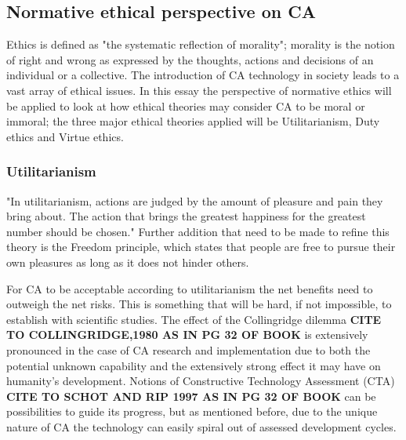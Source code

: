 \subsection{Normative ethical perspective on CA}

Ethics is defined as "the systematic reflection of morality"\cite[ch. 3.2]{Ethics_textbook}; morality is the notion of right and wrong as expressed by the thoughts, actions and decisions of an individual or a collective. The introduction of CA technology in society leads to a vast array of ethical issues. In this essay the perspective of normative ethics will be applied to look at how ethical theories may consider CA to be moral or immoral; the three major ethical theories applied will be Utilitarianism, Duty ethics and Virtue ethics.



\subsubsection{Utilitarianism}

"In utilitarianism, actions are judged by the amount of pleasure and pain they bring about. The action that brings the greatest happiness for the greatest number should be chosen." \cite[ch. 3.7]{Ethics_textbook} Further addition that need to be made to refine this theory is the Freedom principle, which states that people are free to pursue their own pleasures as long as it does not hinder others. 

For CA to be acceptable according to utilitarianism the net benefits need to outweigh the net risks. This is something that will be hard, if not impossible, to establish with scientific studies. The effect of the Collingridge dilemma {\bf CITE TO COLLINGRIDGE,1980 AS IN PG 32 OF BOOK} is extensively pronounced in the case of CA research and implementation due to both the potential unknown capability and the extensively strong effect it may have on humanity's development. Notions of Constructive Technology Assessment (CTA) {\bf CITE TO SCHOT AND RIP 1997 AS IN PG 32 OF BOOK} can be possibilities to guide its progress, but as mentioned before, due to the unique nature of CA the technology can easily spiral out of assessed development cycles. 

